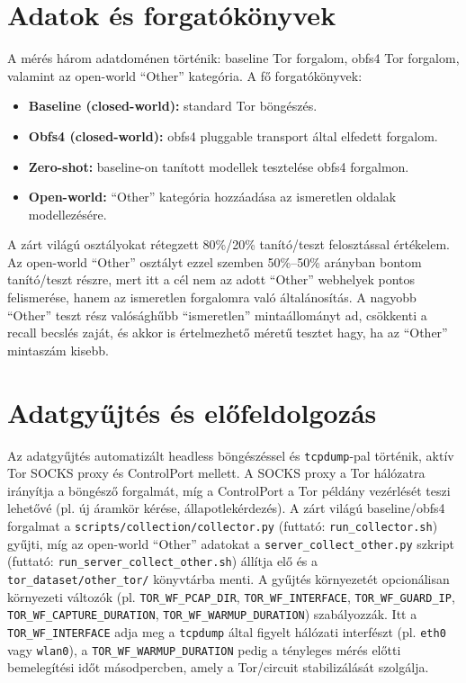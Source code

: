 \documentclass[a4paper,12pt]{article}
\begin{document}
\section{Adatok és forgatókönyvek}
A mérés három adatdoménen történik: baseline Tor forgalom, obfs4 Tor forgalom, valamint
az open-world ``Other'' kategória. A fő forgatókönyvek:
\begin{itemize}
    \item \textbf{Baseline (closed-world):} standard Tor böngészés.
    \item \textbf{Obfs4 (closed-world):} obfs4 pluggable transport által elfedett forgalom.
    \item \textbf{Zero-shot:} baseline-on tanított modellek tesztelése obfs4 forgalmon.
    \item \textbf{Open-world:} ``Other'' kategória hozzáadása az ismeretlen oldalak modellezésére.
\end{itemize}
A zárt világú osztályokat rétegzett 80\%/20\% tanító/teszt felosztással értékelem. Az
open-world ``Other'' osztályt ezzel szemben 50\%--50\% arányban bontom tanító/teszt
részre, mert itt a cél nem az adott ``Other'' webhelyek pontos felismerése, hanem az
ismeretlen forgalomra való általánosítás. A nagyobb ``Other'' teszt rész valósághűbb
``ismeretlen'' mintaállományt ad, csökkenti a recall becslés zaját, és akkor is
értelmezhető méretű tesztet hagy, ha az ``Other'' mintaszám kisebb.

\section{Adatgyűjtés és előfeldolgozás}
Az adatgyűjtés automatizált headless böngészéssel és \texttt{tcpdump}-pal történik, aktív Tor
SOCKS proxy és ControlPort mellett. A SOCKS proxy a Tor hálózatra irányítja a böngésző
forgalmát, míg a ControlPort a Tor példány vezérlését teszi lehetővé (pl. új áramkör
kérése, állapotlekérdezés). A zárt világú baseline/obfs4 forgalmat a
\texttt{scripts/collection/collector.py} (futtató: \texttt{run\_collector.sh}) gyűjti, míg
az open-world ``Other'' adatokat a \texttt{server\_collect\_other.py} szkript (futtató:
\texttt{run\_server\_collect\_other.sh}) állítja elő és a \texttt{tor\_dataset/other\_tor/}
könyvtárba menti. A gyűjtés környezetét opcionálisan környezeti változók (pl.
\texttt{TOR\_WF\_PCAP\_DIR}, \texttt{TOR\_WF\_INTERFACE}, \texttt{TOR\_WF\_GUARD\_IP},
\texttt{TOR\_WF\_CAPTURE\_DURATION}, \texttt{TOR\_WF\_WARMUP\_DURATION}) szabályozzák.
Itt a \texttt{TOR\_WF\_INTERFACE} adja meg a \texttt{tcpdump} által figyelt hálózati
interfészt (pl. \texttt{eth0} vagy \texttt{wlan0}), a \texttt{TOR\_WF\_WARMUP\_DURATION}
pedig a tényleges mérés előtti bemelegítési időt másodpercben, amely a Tor/circuit
stabilizálását szolgálja.
\end{document}
